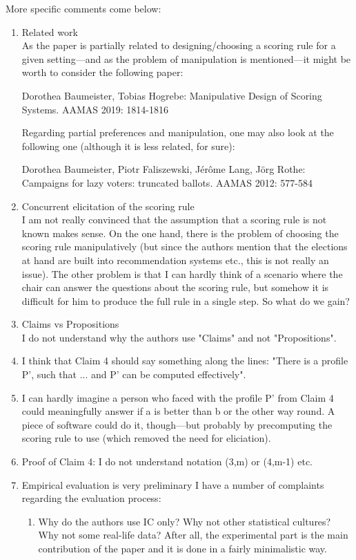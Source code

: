\documentclass[version=3.21, pagesize, twoside=off, bibliography=totoc, DIV=calc, fontsize=12pt, a4paper]{scrartcl}
\begin{document}
More specific comments come below:
\begin{enumerate}
\item Related work \\
As the paper is partially related to designing/choosing a scoring rule for a given setting---and as the problem of manipulation is mentioned---it might be worth to consider the following paper:

Dorothea Baumeister, Tobias Hogrebe:
Manipulative Design of Scoring Systems. AAMAS 2019: 1814-1816

Regarding partial preferences and manipulation, one may also look at the following one (although it is less related, for sure):

Dorothea Baumeister, Piotr Faliszewski, Jérôme Lang, Jörg Rothe:
Campaigns for lazy voters: truncated ballots. AAMAS 2012: 577-584


\item Concurrent elicitation of the scoring rule \\
I am not really convinced that the assumption that a scoring rule is not known makes sense. On the one hand, there is the problem of choosing the scoring rule manipulatively (but since the authors mention that the elections at hand are built into recommendation systems etc., this is not really an issue). The other problem is that I can hardly think of a scenario where the chair can answer the questions about the scoring rule, but somehow it is difficult for him to produce the full rule in a single step. So what do we gain?

\item Claims vs Propositions \\
I do not understand why the authors use "Claims" and not "Propositions".

\item I think that Claim 4 should say something along the lines: "There is a profile P', such that ... and P' can be computed effectively".

\item I can hardly imagine a person who faced with the profile P' from Claim 4 could meaningfully answer if a is better than b or the other way round. A piece of software could do it, though---but probably by precomputing the scoring rule to use (which removed the need for eliciation).

\item Proof of Claim 4: I do not understand notation (3,m) or (4,m-1) etc.

\item Empirical evaluation is very preliminary
I have a number of complaints regarding the evaluation process:
	\begin{enumerate}
		\item Why do the authors use IC only? Why not other statistical cultures? Why not some real-life data? After all, the experimental part is the main contribution of the paper and it is done in a fairly minimalistic way.
		

\end{enumerate}
\end{enumerate}
\end{document}
